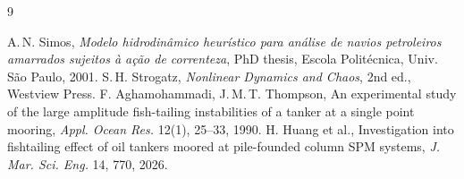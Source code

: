 \documentclass[11pt,a4paper]{article}
\begin{document}
\begingroup
\footnotesize
\begin{thebibliography}{9}
\setlength{\itemsep}{0pt}\setlength{\parskip}{0pt}
 A.\,N. Simos, \emph{Modelo hidrodin\^amico heur\'istico para an\'alise de navios petroleiros amarrados
sujeitos \`a a\c{c}\~ao de correnteza}, PhD thesis, Escola Polit\'ecnica, Univ. S\~ao Paulo, 2001.
 S.\,H. Strogatz, \emph{Nonlinear Dynamics and Chaos}, 2nd ed., Westview Press.
 F. Aghamohammadi, J.\,M.\,T. Thompson, An experimental study of the large amplitude
fish-tailing instabilities of a tanker at a single point mooring, \emph{Appl. Ocean Res.} 12(1), 25--33, 1990.
 H. Huang et al., Investigation into fishtailing effect of oil tankers moored at pile-founded column
SPM systems, \emph{J. Mar. Sci. Eng.} 14, 770, 2026.
\end{thebibliography}
\endgroup
\end{document}
